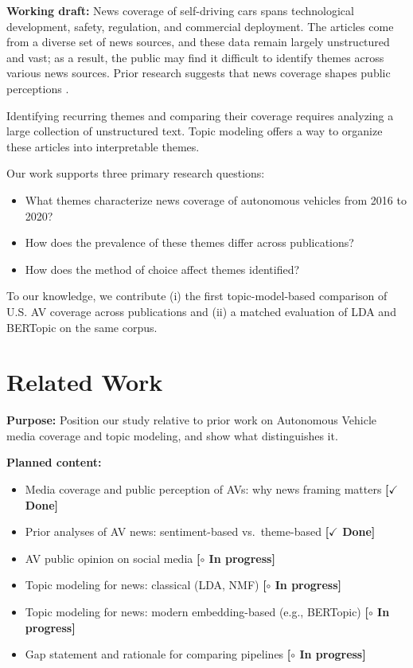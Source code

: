 \documentclass[conference]{IEEEtran}
\newcommand{\done}{\textcolor{green!40!black}{\textbf{[$\checkmark$ Done]}}}
\newcommand{\wip}{\textcolor{orange!70!black}{\textbf{[$\circ$ In progress]}}}
\begin{document}
\textbf{Working draft:}
News coverage of self-driving cars spans technological development, safety, regulation, and commercial deployment. The articles come from a diverse set of news sources, and these data remain largely unstructured and vast; as a result, the public may find it difficult to identify themes across various news sources. Prior research suggests that news coverage shapes public perceptions \cite{christen2007media, anania2018effects}.

Identifying recurring themes and comparing their coverage requires analyzing a large collection of unstructured text. Topic modeling offers a way to organize these articles into interpretable themes.

Our work supports three primary research questions: 
\begin{itemize}
    \item What themes characterize news coverage of autonomous vehicles from 2016 to 2020?
    \item How does the prevalence of these themes differ across publications?
    \item How does the method of choice affect themes identified? 
\end{itemize}

To our knowledge, we contribute (i) the first topic-model-based comparison of U.S. AV coverage across publications and (ii) a matched evaluation of LDA and BERTopic on the same corpus.

\section*{Related Work}

\textbf{Purpose:} Position our study relative to prior work on Autonomous Vehicle media coverage and topic modeling, and show what distinguishes it.

\textbf{Planned content:}
\begin{itemize}
    \item Media coverage and public perception of AVs: why news framing matters \cite{christen2007media, anania2018effects} \done
    \item Prior analyses of AV news: sentiment-based
          \cite{penmetsa2023news} vs.\ theme-based
          \cite{jelinski2021undifferentiated} \done
    \item AV public opinion on social media \cite{bakalos2020} \wip
    \item Topic modeling for news: classical (LDA, NMF) \cite{blei2003lda} \wip
    \item Topic modeling for news: modern embedding-based (e.g., BERTopic) \wip   
    \item Gap statement and rationale for comparing pipelines \wip
\end{itemize}
\end{document}
